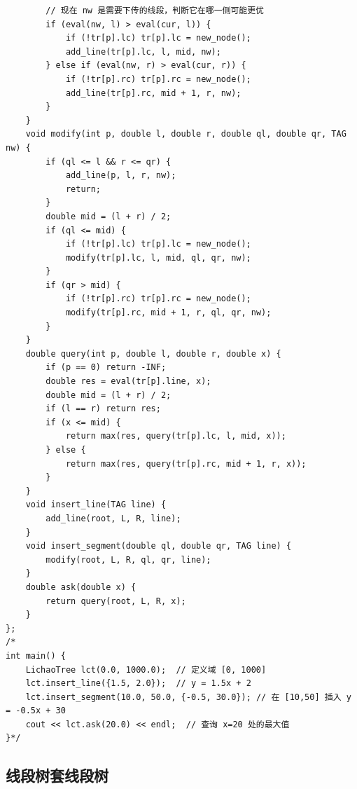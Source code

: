 \begin{lstlisting}
        // 现在 nw 是需要下传的线段，判断它在哪一侧可能更优
        if (eval(nw, l) > eval(cur, l)) {
            if (!tr[p].lc) tr[p].lc = new_node();
            add_line(tr[p].lc, l, mid, nw);
        } else if (eval(nw, r) > eval(cur, r)) {
            if (!tr[p].rc) tr[p].rc = new_node();
            add_line(tr[p].rc, mid + 1, r, nw);
        }
    }
    void modify(int p, double l, double r, double ql, double qr, TAG nw) {
        if (ql <= l && r <= qr) {
            add_line(p, l, r, nw);
            return;
        }
        double mid = (l + r) / 2;
        if (ql <= mid) {
            if (!tr[p].lc) tr[p].lc = new_node();
            modify(tr[p].lc, l, mid, ql, qr, nw);
        }
        if (qr > mid) {
            if (!tr[p].rc) tr[p].rc = new_node();
            modify(tr[p].rc, mid + 1, r, ql, qr, nw);
        }
    }
    double query(int p, double l, double r, double x) {
        if (p == 0) return -INF; 
        double res = eval(tr[p].line, x);
        double mid = (l + r) / 2;
        if (l == r) return res;
        if (x <= mid) {
            return max(res, query(tr[p].lc, l, mid, x));
        } else {
            return max(res, query(tr[p].rc, mid + 1, r, x));
        }
    }
    void insert_line(TAG line) {
        add_line(root, L, R, line);
    }
    void insert_segment(double ql, double qr, TAG line) {
        modify(root, L, R, ql, qr, line);
    }
    double ask(double x) {
        return query(root, L, R, x);
    }
};
/*
int main() {
    LichaoTree lct(0.0, 1000.0);  // 定义域 [0, 1000]
    lct.insert_line({1.5, 2.0});  // y = 1.5x + 2
    lct.insert_segment(10.0, 50.0, {-0.5, 30.0}); // 在 [10,50] 插入 y = -0.5x + 30
    cout << lct.ask(20.0) << endl;  // 查询 x=20 处的最大值
}*/
\end{lstlisting}

\subsection{线段树套线段树}

